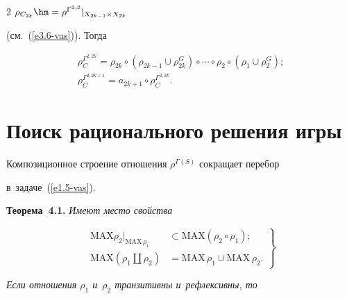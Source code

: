 \begin{multicols}{2}
$\rho_{C_{2k}} \hm= \rho^{\Gamma^{2,2}}\vert_{X_{2k-1}\times X_{2k}}$ 

(см.~(\ref{e3.6-vas})). Тогда 

    \begin{multline*}

    \rho_C^{\Gamma^{2,2k}} =\rho_{2k} \circ\left( \rho_{2k-1} \cup \rho^G_{2k} 

\right)\circ\cdots\circ \rho_2 \circ\left( \rho_1\cup \rho_2^G\right);\\

    \rho_C^{\Gamma^{2,2k+1}} =a_{2k+1}\circ \rho_C^{\Gamma^{2,2k}}.

  \end{multline*}



\section{Поиск рационального решения игры}



    Композиционное строение отношения $\rho^{\Gamma(S)}$ со\-кра\-ща\-ет перебор 

в~задаче~(\ref{e1.5-vas}). 

    

    \smallskip

    

    \noindent

    \textbf{Теорема~4.1.} \textit{Имеют мес\-то свойства}

    \begin{equation}

    \left.

    \begin{array}{rl}

    \mathrm{MAX}\rho_2\vert_{\mathrm{MAX}\,\rho_1} &\subset \mathrm{MAX} \left(\rho_2\circ\rho_1\right);\\[6pt]

    \mathrm{MAX}\left(\rho_1\coprod\rho_2\right) &=\mathrm{MAX}\,\rho_1\cup \mathrm{MAX}\, \rho_2.

    \end{array}

    \right\}

    \label{e4.1-vas}

    \end{equation}

 \textit{Если отношения $\rho_1$ и~$\rho_2$ транзитивны и~рефлексивны, то} 


\end{multicols}
